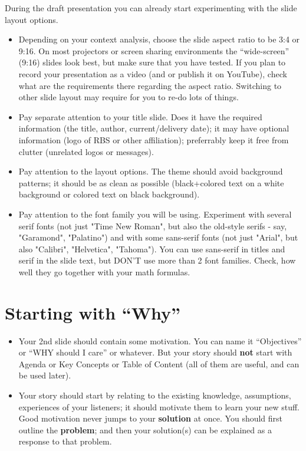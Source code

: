 \documentclass[jou]{apa6}
\begin{document}
During the draft presentation you can already start experimenting with the slide layout options. 
\begin{itemize}
\item Depending on your context analysis, choose the slide aspect ratio to be 
3:4 or 9:16. On most projectors or screen sharing environments 
the ``wide-screen'' (9:16) slides look best, but make sure 
that you have tested. If you plan to record your presentation as a video 
(and or publish it on YouTube), check what are the requirements there regarding
the aspect ratio. Switching to other slide layout may require for you to re-do lots of things.
\item Pay separate attention to your title slide. Does it have the required information
(the title, author, current/delivery date); it may have 
optional information (logo of RBS or other affiliation); preferrably keep it free from clutter
(unrelated logos or messages). 
\item Pay attention to the layout options. The theme should avoid background patterns; it should be
as clean as possible (black+colored text on a white background or colored text on black background). 
\item Pay attention to the font family you will be using. 
Experiment with several serif fonts (not just "Time New Roman", but also 
the old-style serifs - say, "Garamond", "Palatino") and with some sans-serif fonts
(not just "Arial", but also "Calibri", "Helvetica", "Tahoma"). 
You can use sans-serif in titles and serif in the slide text, but DON'T use more than 2 font families.
Check, how well they go together with your math formulas.
\end{itemize}


\section{Starting with ``Why''}

\begin{itemize}
\item Your 2nd slide should contain some motivation.
You can name it ``Objectives'' or ``WHY should I care'' or whatever. But your story should 
{\bf not} start with Agenda or Key Concepts or Table of Content (all of them 
are useful, and can be used later).
\item Your story should start by relating to the existing knowledge, assumptions, experiences of your 
listeners; it should motivate them to learn your new stuff. 
Good motivation never jumps to your {\bf solution} at once. You should first outline the 
{\bf problem}; and then your solution(s) can be explained as a response to that problem.
\end{itemize}
\end{document}
